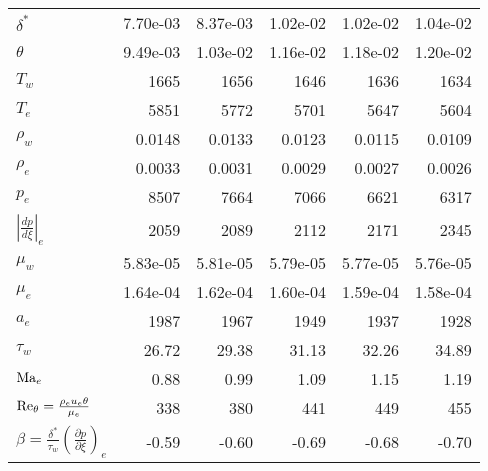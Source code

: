 \begin{table}[p]
\begin{tabular}{l|rrrrr}
 $\delta^*$                                                                        & 7.70e-03  & 8.37e-03  & 1.02e-02  & 1.02e-02  & 1.04e-02  \\
 $\theta$                                                                          & 9.49e-03  & 1.03e-02  & 1.16e-02  & 1.18e-02  & 1.20e-02  \\
 $T_w$                                                                             & 1665      & 1656      & 1646      & 1636      & 1634      \\
 $T_e$                                                                             & 5851      & 5772      & 5701      & 5647      & 5604      \\
 $\rho_w$                                                                          & 0.0148    & 0.0133    & 0.0123    & 0.0115    & 0.0109    \\
 $\rho_e$                                                                          & 0.0033    & 0.0031    & 0.0029    & 0.0027    & 0.0026    \\
 $p_e$                                                                             & 8507      & 7664      & 7066      & 6621      & 6317      \\
 $\left|\frac{d p}{d \xi}\right|_e$                                                & 2059      & 2089      & 2112      & 2171      & 2345      \\
 $\mu_w$                                                                           & 5.83e-05  & 5.81e-05  & 5.79e-05  & 5.77e-05  & 5.76e-05  \\
 $\mu_e$                                                                           & 1.64e-04  & 1.62e-04  & 1.60e-04  & 1.59e-04  & 1.58e-04  \\
 $a_e$                                                                             & 1987      & 1967      & 1949      & 1937      & 1928      \\
 $\tau_w$                                                                          & 26.72     & 29.38     & 31.13     & 32.26     & 34.89     \\
\hline
 $\Mach[e]{}$                                                                      & 0.88      & 0.99      & 1.09      & 1.15      & 1.19      \\
 $\Reynolds[\theta]{} = \frac{\rho_e u_e \theta}{\mu_e}$                           & 338       & 380       & 441       & 449       & 455       \\
 $\beta = \frac{\delta^\ast}{\tau_w}\left(\frac{\partial p}{\partial\xi}\right)_e$ & -0.59     & -0.60     & -0.69     & -0.68     & -0.70     \\
\end{tabular}
\end{table}



